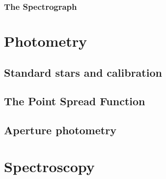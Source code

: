 \documentclass[12pt,twoside,a4paper]{report}
\begin{document}
\subsection{The Spectrograph}


\chapter{Photometry}

\section{Standard stars and calibration}

\section{The Point Spread Function}

\section{Aperture photometry}


\chapter{Spectroscopy}






\end{document}
